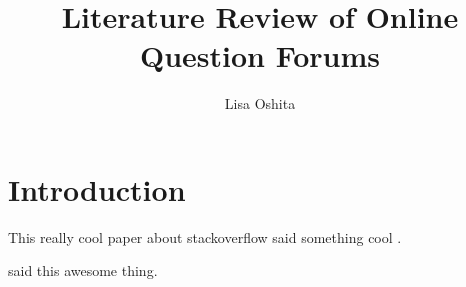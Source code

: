 \documentclass[12pt]{article}
\title{Literature Review of Online Question Forums}
\author{Lisa Oshita}
\date{}
\begin{document}
\maketitle

\section{Introduction}


This really cool paper about stackoverflow said something cool \citep{Ponzanelli2014}.  


\cite{Ponzanelli2014} said this awesome thing.




\end{document}
